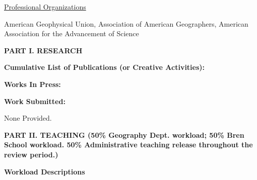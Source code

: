 \documentclass[10pt]{article}
\begin{document}
\vspace{0.5cm}
\underline{Professional Organizations}

American Geophysical Union, Association of American Geographers, American Association for the Advancement of Science

\vspace{0.5cm}

\newpage

\textbf{PART I.  RESEARCH}

\vspace{0.2cm}
{\bf Cumulative List of Publications (or Creative Activities):}

{\setlength{\extrarowheight}{3.5pt}
}

\vspace{0.2cm}
{\bf Works In Press:}

{\setlength{\extrarowheight}{3.5pt}

}

 

\vspace{0.2cm}

{\bf Work Submitted:}


% 
None Provided.


\vspace{1cm}
\textbf{PART II.  TEACHING (50\% Geography Dept. workload; 50\% Bren School workload. 50\% Administrative teaching release throughout the review period.)}

\vspace{0.5cm}

\textbf{Workload Descriptions}
\end{document}
